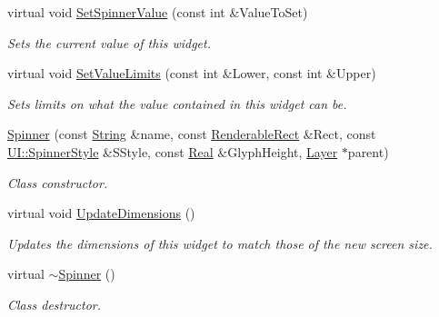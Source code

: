 \begin{DoxyCompactItemize}
virtual void \hyperlink{classMezzanine_1_1UI_1_1Spinner_a4bf3e5d71b3553f6991529a46b98750a}{SetSpinnerValue} (const int \&ValueToSet)
\begin{DoxyCompactList}\small\item\em Sets the current value of this widget. \item\end{DoxyCompactList}\item 
virtual void \hyperlink{classMezzanine_1_1UI_1_1Spinner_a9b427cbf7fb292461466d1987a441f43}{SetValueLimits} (const int \&Lower, const int \&Upper)
\begin{DoxyCompactList}\small\item\em Sets limits on what the value contained in this widget can be. \item\end{DoxyCompactList}\item 
\hyperlink{classMezzanine_1_1UI_1_1Spinner_ad8f08046b19ec7f82137984eed5e9597}{Spinner} (const \hyperlink{namespaceMezzanine_acf9fcc130e6ebf08e3d8491aebcf1c86}{String} \&name, const \hyperlink{structMezzanine_1_1UI_1_1RenderableRect}{RenderableRect} \&Rect, const \hyperlink{namespaceMezzanine_1_1UI_a62462d4df783dcdda77e1590a96bc6d6}{UI::SpinnerStyle} \&SStyle, const \hyperlink{namespaceMezzanine_a726731b1a7df72bf3583e4a97282c6f6}{Real} \&GlyphHeight, \hyperlink{classMezzanine_1_1UI_1_1Layer}{Layer} $\ast$parent)
\begin{DoxyCompactList}\small\item\em Class constructor. \item\end{DoxyCompactList}\item 
virtual void \hyperlink{classMezzanine_1_1UI_1_1Spinner_a05358d8643601df5e552b687ce079899}{UpdateDimensions} ()
\begin{DoxyCompactList}\small\item\em Updates the dimensions of this widget to match those of the new screen size. \item\end{DoxyCompactList}\item 
\hypertarget{classMezzanine_1_1UI_1_1Spinner_ae76d246ca5c7e8e5166e1149caaf55fc}{
virtual \hyperlink{classMezzanine_1_1UI_1_1Spinner_ae76d246ca5c7e8e5166e1149caaf55fc}{$\sim$Spinner} ()}
\label{classMezzanine_1_1UI_1_1Spinner_ae76d246ca5c7e8e5166e1149caaf55fc}

\begin{DoxyCompactList}\small\item\em Class destructor. \item\end{DoxyCompactList}\end{DoxyCompactItemize}
